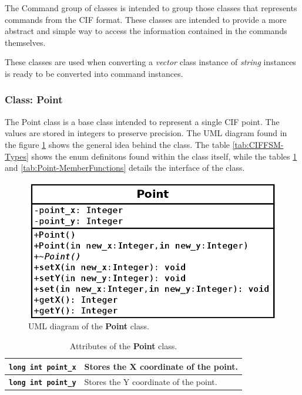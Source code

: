 \documentclass[11pt,twoside,openany,x11names,svgnames]{memoir}
\begin{document}
The Command group of classes is intended to group those classes that represents commands from the CIF format. These classes are intended to provide a more abstract and simple way to access the information contained in the commands themselves.

These classes are used when converting a \textit{vector} class instance of \textit{string} instances is ready to be converted into command instances.

\subsubsection{Class: Point}\label{Class-Point}

The Point class is a base class intended to represent a single CIF point. The values are stored in integers to preserve precision. The UML diagram found in the figure \ref{fig:class-point} shows the general idea behind the class. The table \ref{tab:CIFFSM-Types} shows the enum definitons found within the class itself, while the tables \ref{tab:Point-Attributes} and \ref{tab:Point-MemberFunctions} details the interface of the class.

\begin{figure}
	\centering
	\includegraphics[scale=0.4, clip=true, trim= 0pt 0pt 0pt 0pt]{images/chapter03-image12}
	\caption{UML diagram of the \textbf{Point} class.}
	\label{fig:class-point}
\end{figure}

\begin{table}[h]\footnotesize
\centering
\begin{tabular}{| >{\bfseries}p{5.5cm} | p{10cm} |}
	\hline
	
	\texttt{long int point\_x} & Stores the X coordinate of the point. \\
	
	\hline
	
	\texttt{long int point\_y} & Stores the Y coordinate of the point. \\
	
	\hline
\end{tabular}
\caption{Attributes of the \textbf{Point} class.}
\label{tab:Point-Attributes}
\end{table}
\end{document}
